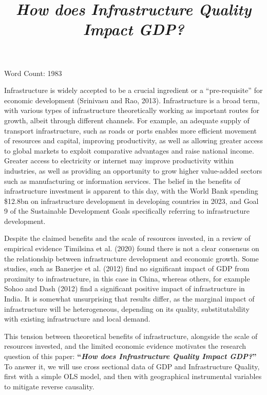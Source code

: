 \documentclass[12pt,a4paper]{article}
\title{\textit{How does Infrastructure Quality Impact GDP?}}
\author{}
\date{}
\begin{document}
\maketitle
\noindent Word Count: 1983

\vspace{1em}

Infrastructure is widely accepted to be a crucial ingredient or a ``pre-requisite'' for economic development (Srinivasu and Rao, 2013). Infrastructure is a broad term, with various types of infrastructure theoretically working as important routes for growth, albeit through different channels. For example, an adequate supply of transport infrastructure, such as roads or ports enables more efficient movement of resources and capital, improving productivity, as well as allowing greater access to global markets to exploit comparative advantages and raise national income. Greater access to electricity or internet may improve productivity within industries, as well as providing an opportunity to grow higher value-added sectors such as manufacturing or information services. The belief in the benefits of infrastructure investment is apparent to this day, with the World Bank spending \$12.8bn on infrastructure development in developing countries in 2023, and Goal 9 of the Sustainable Development Goals specifically referring to infrastructure development.

Despite the claimed benefits and the scale of resources invested, in a review of empirical evidence Timilsina et al. (2020) found there is not a clear consensus on the relationship between infrastructure development and economic growth. Some studies, such as Banerjee et al. (2012) find no significant impact of GDP from proximity to infrastructure, in this case in China, whereas others, for example Sohoo and Dash (2012) find a significant positive impact of infrastructure in India. It is somewhat unsurprising that results differ, as the marginal impact of infrastructure will be heterogeneous, depending on its quality, substitutability with existing infrastructure and local demand.

This tension between theoretical benefits of infrastructure, alongside the scale of resources invested, and the limited economic evidence motivates the research question of this paper: \textbf{``\textit{How does Infrastructure Quality Impact GDP?}''} To answer it, we will use cross sectional data of GDP and Infrastructure Quality, first with a simple OLS model, and then with geographical instrumental variables to mitigate reverse causality.
\end{document}
